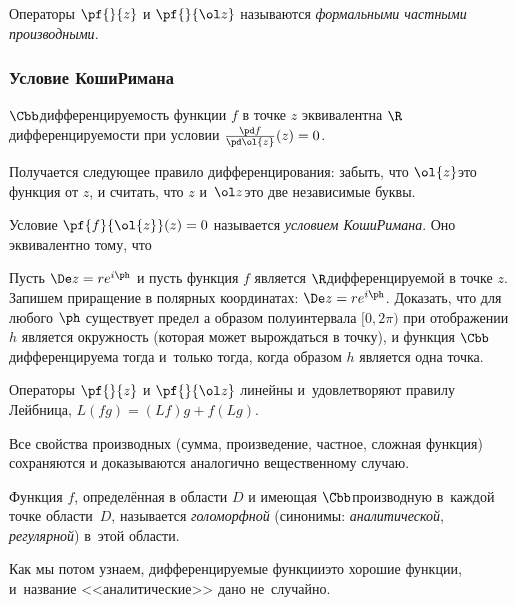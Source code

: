 \documentclass[a4paper]{article}
\begin{document}
\begin{df}
Операторы $\pf{}{z}$ и $\pf{}{\ol z}$ называются \emph{формальными частными производными}.
\end{df}

\subsubsection{Условие Коши\ч Римана}

\begin{prop}
$\Cbb$\д дифференцируемость функции $f$ в точке $z$ эквивалентна $\R$\д дифференцируемости
при условии $\frac{\pd f}{\pd \ol{z}}(z) = 0$.
\end{prop}

Получается следующее правило дифференцирования: забыть, что $ \ol{z}$\т это функция от $z$, и считать,
что $z$ и~$\ol z$\т это две независимые буквы.

Условие $\pf{f}{\ol{z}}(z) = 0$ называется \emph{условием Коши\ч Римана}. Оно эквивалентно тому, что


\begin{problem}
Пусть $\De z = r e^{i\ph}$ и пусть функция  $f$ является $\R$\д дифференцируемой в точке $z$. Запишем приращение в полярных координатах:
$\De z=re^{i\ph}$. Доказать, что для любого $\ph$ существует предел
а образом полуинтервала $[0, 2\pi)$ при отображении $h$ является окружность (которая может вырождаться в точку),
и функция $\Cbb$\д дифференцируема тогда и~только тогда, когда образом $h$ является одна точка.
\end{problem}

Операторы $\pf{}{z}$ и $\pf{}{\ol z}$ линейны и~удовлетворяют правилу Лейбница,  $L(fg) = (Lf)g+f(Lg)$.

Все свойства производных (сумма, произведение, частное, сложная функция) сохраняются и доказываются аналогично
вещественному случаю.

\begin{df}
Функция $f$, определённая в области $D$ и имеющая $\Cbb$\д производную в~каждой точке области~$D$, называется
\emph{голоморфной} (синонимы: \emph{аналитической}, \emph{регулярной}) в~этой области.
\end{df}

Как мы потом узнаем, дифференцируемые функции\т это хорошие функции, и~название <<аналитические>> дано не~случайно.
\end{document}
